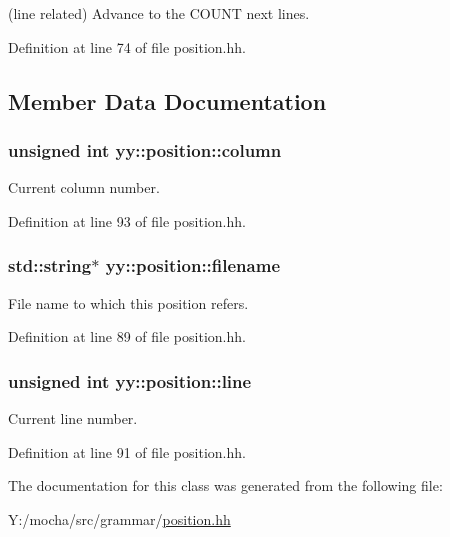 (line related) Advance to the COUNT next lines. 



Definition at line 74 of file position.hh.



\subsection{Member Data Documentation}
\hypertarget{classyy_1_1position_ada60c2dbba2e05705265f8359f722c4f}{
\subsubsection[{column}]{\setlength{\rightskip}{0pt plus 5cm}unsigned int {\bf yy::position::column}}}
\label{classyy_1_1position_ada60c2dbba2e05705265f8359f722c4f}


Current column number. 



Definition at line 93 of file position.hh.

\hypertarget{classyy_1_1position_a88d2d070ec4751e5d5b1999bb2dc2116}{
\subsubsection[{filename}]{\setlength{\rightskip}{0pt plus 5cm}std::string$\ast$ {\bf yy::position::filename}}}
\label{classyy_1_1position_a88d2d070ec4751e5d5b1999bb2dc2116}


File name to which this position refers. 



Definition at line 89 of file position.hh.

\hypertarget{classyy_1_1position_aa3806654fd62786a0446a461d55755d6}{
\subsubsection[{line}]{\setlength{\rightskip}{0pt plus 5cm}unsigned int {\bf yy::position::line}}}
\label{classyy_1_1position_aa3806654fd62786a0446a461d55755d6}


Current line number. 



Definition at line 91 of file position.hh.



The documentation for this class was generated from the following file:\begin{DoxyCompactItemize}
\item 
Y:/mocha/src/grammar/\hyperlink{position_8hh}{position.hh}\end{DoxyCompactItemize}
